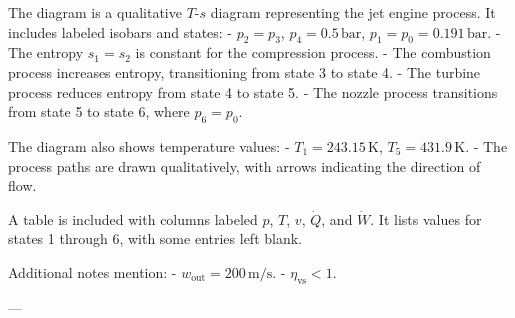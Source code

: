 The diagram is a qualitative \( T \)-\( s \) diagram representing the jet engine process. It includes labeled isobars and states:  
- \( p_2 = p_3 \), \( p_4 = 0.5 \, \text{bar} \), \( p_1 = p_0 = 0.191 \, \text{bar} \).  
- The entropy \( s_1 = s_2 \) is constant for the compression process.  
- The combustion process increases entropy, transitioning from state 3 to state 4.  
- The turbine process reduces entropy from state 4 to state 5.  
- The nozzle process transitions from state 5 to state 6, where \( p_6 = p_0 \).  

The diagram also shows temperature values:  
- \( T_1 = 243.15 \, \text{K} \), \( T_5 = 431.9 \, \text{K} \).  
- The process paths are drawn qualitatively, with arrows indicating the direction of flow.  

A table is included with columns labeled \( p \), \( T \), \( v \), \( \dot{Q} \), and \( \dot{W} \). It lists values for states 1 through 6, with some entries left blank.  

Additional notes mention:  
- \( w_{\text{out}} = 200 \, \text{m/s} \).  
- \( \eta_{\text{vs}} < 1 \).  

---